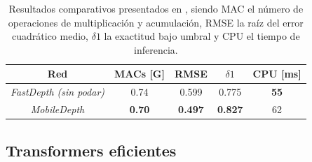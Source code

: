 \documentclass[a4paper, 11pt]{article}
\newcommand{\textbfit}[1]{\textbf{\textit{#1}}}
\begin{document}
\begin{itemize}
    \begin{table}[H]
    \centering
    \begin{tabular}{@{}ccccc@{}}
    \toprule
    Red                            & MACs {[}G{]}  & RMSE           & $\delta1$ & CPU {[}ms{]} \\ \midrule
    \textit{FastDepth (sin podar)} & 0.74          & 0.599          & 0.775                  & \textbf{55}  \\
    \textit{MobileDepth}           & \textbf{0.70} & \textbf{0.497} & \textbf{0.827}         & 62           \\ \bottomrule
    \end{tabular}
    \caption{Resultados comparativos presentados en \cite{wang2020mobiledepth}, siendo MAC el número de operaciones de multiplicación y acumulación, RMSE la raíz del error cuadrático medio, $\delta1$ la exactitud bajo umbral \cite{depth-estimation-metrics} y CPU el tiempo de inferencia.}
    \label{tab:comparacion-fastdepth-mobile-depth}
    \end{table}
    
\end{itemize}

\subsection{Transformers eficientes}\label{transformers-eficientes}
\end{document}
